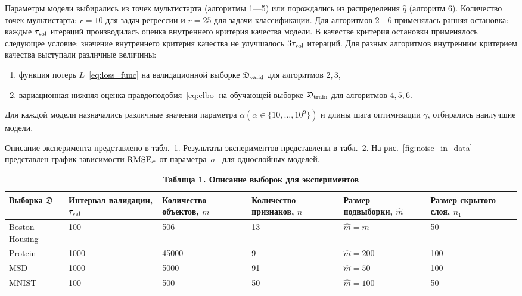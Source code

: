Параметры модели выбирались из точек мультистарта (алгоритмы 1---5) или порождались из распределения $\hat{q}$ (алгоритм 6). Количество точек мультистарта: $r=10$ {для задач регрессии и $r=25$ для задачи классификации}.
Для алгоритмов 2---6 применялась ранняя остановка: каждые $\tau_\textnormal{val}$ итераций производилась оценка внутреннего критерия качества модели. В качестве критерия остановки применялось следующее условие: значение внутреннего критерия качества не улучшалось $3\tau_\textnormal{val}$ итераций. Для разных алгоритмов внутренним критерием качества выступали различные величины:
\begin{enumerate}
\item функция потерь $L$~\eqref{eq:loss_func} на валидационной выборке $\mathfrak{D}_\textnormal{valid}$ для алгоритмов $2,3$,
\item вариационная нижняя оценка правдоподобия~\eqref{eq:elbo} на обучающей выборке $\mathfrak{D}_\textnormal{train}$ для алгоритмов $4,5,6$.
\end{enumerate}

Для каждой модели назначались различные значения параметра $\alpha (\alpha \in \{10, \dots, 10^9\})$ и длины шага оптимизации $\gamma$, отбирались наилучшие модели. %



Описание эксперимента представлено в табл.~1. Результаты экспериментов представлены в табл.~2. На рис.~\ref{fig:noise_in_data} представлен график зависимости $\textnormal{RMSE}_{\sigma}$ от параметра~$\sigma$~{ для однослойных моделей}. 

\begin{table}[!htbp]
\captionsetup{justification=raggedright,singlelinecheck=false}
\label{table1}
\caption*{\textbf{Таблица 1. Описание выборок для экспериментов}}
\footnotesize
\centering

\begin{tabular}{ | p{2cm} |p{2cm} | p{2cm} | p{2cm} | p{2cm} | p{2cm} | }
\hline
Выборка $\mathfrak{D}$ & Интервал валидации, $\tau_\textnormal{val}$ & Количество объектов, $m$ & Количество признаков, $n$ & Размер подвыборки, $\hat{m}$ &  Размер скрытого слоя, $n_1$ \\
\hline
Boston Housing & 100 & 506 & 13 & $\hat{m} = m$ & 50 \\
\hline
Protein & 1000 & 45000 & 9 & $\hat{m} = 200$ & 100 \\
\hline
MSD & 1000& 5000 & 91 & $\hat{m} = 50$ & 100\\
\hline
MNIST & 100  & 500 & 50 & $\hat{m} = 100$ & 50\\ 
\hline
\end{tabular}
\end{table}


